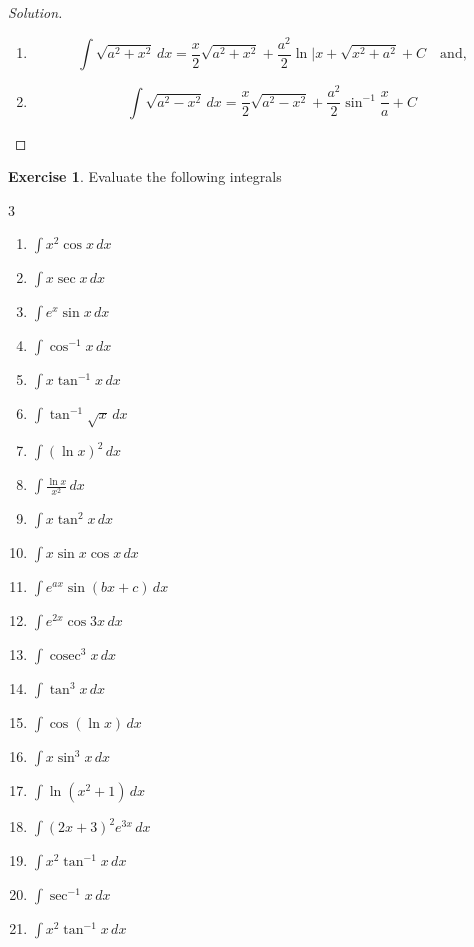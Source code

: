 \documentclass{book}
\DeclareMathOperator{\cosec}{cosec}
\theoremstyle{definition}
\newtheorem{exercise}{Exercise}[section]
\newenvironment{solution}
    {\begin{proof}[Solution]}
    {\end{proof}}
\begin{document}
\begin{solution}
\begin{enumerate}[label=(\roman*)]
In other words,
\[
\int \sqrt{x^2-a^2}\,dx=\frac{1}{2}\left[x\sqrt{x^2-a^2}-a^2\ln|x+x\sqrt{x^2-a^2}|\right]+C
\]

Similarly we can prove that,

\item 
\[
\int \sqrt{a^2+x^2}\,dx = \frac{x}{2}\sqrt{a^2+x^2}+\frac{a^2}{2}\ln|x+\sqrt{x^2+a^2}+C \quad \text{and,}
\]

\item \[
\int \sqrt{a^2-x^2}\,dx = \frac{x}{2}\sqrt{a^2-x^2}+\frac{a^2}{2}\sin^{-1}\frac{x}{a}+C
\]

\end{enumerate} 
\end{solution}
\newpage
\begin{exercise}
Evaluate the following integrals
\begin{multicols}{3}
\begin{enumerate}[label=(\roman*)]
    \item $\displaystyle\int x^2\cos x\,dx$
    \item $\displaystyle\int x\sec x\,dx$
    \item $\displaystyle\int e^x\sin x\,dx$
    \item $\displaystyle\int \cos^{-1}x\,dx$
    \item $\displaystyle\int x\tan^{-1}x\,dx$
    \item $\displaystyle\int\tan^{-1}\sqrt{x}\,dx$
    \item $\displaystyle\int (\ln x)^2\,dx$
    \item $\displaystyle\int\frac{\ln x}{x^2}\,dx$
    \item $\displaystyle\int x\tan^2 x\,dx$
    \item $\displaystyle\int x\sin x\cos x\,dx$
    \item $\displaystyle\int e^{ax}\sin (bx+c)\,dx$
    \item $\displaystyle\int e^{2x}\cos 3x\,dx$
    \item $\displaystyle\int \cosec^3x\,dx$
    \item $\displaystyle\int \tan^3x\,dx$
    \item $\displaystyle\int \cos (\ln x)\,dx$
    \item $\displaystyle\int x\sin^3x\,dx$
    \item $\displaystyle\int \ln (x^2+1)\,dx$
    \item $\displaystyle\int (2x+3)^2e^{3x}\,dx$
    \item $\displaystyle\int x^2\tan^{-1}x\,dx$
    \item $\displaystyle\int \sec^{-1}x\,dx$
    \item $\displaystyle\int x^2\tan^{-1}x\,dx$


\end{enumerate}
\end{multicols}    
\end{exercise}
\end{document}
